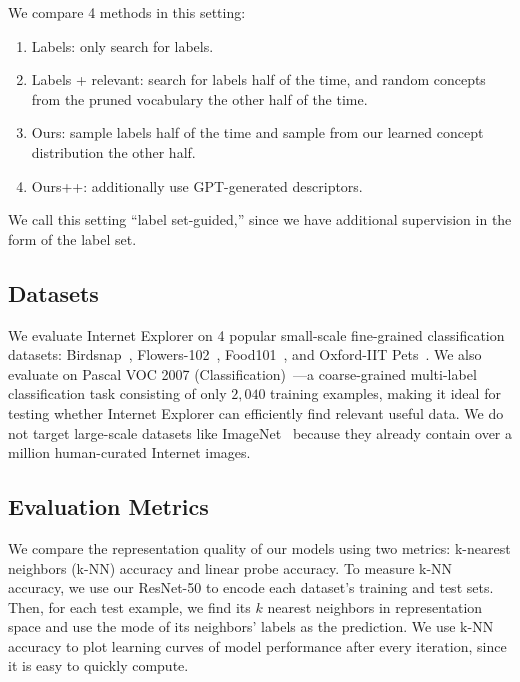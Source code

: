 We compare 4 methods in this setting:
\begin{enumerate}[noitemsep,topsep=0pt]
    \item Labels: only search for labels. 
    \item Labels + relevant: search for labels half of the time, and random concepts from the pruned vocabulary the other half of the time. 
    \item Ours: sample labels half of the time and sample from our learned concept distribution the other half. 
    \item Ours++: additionally use GPT-generated descriptors.
\end{enumerate}
We call this setting ``label set-guided,'' since we have additional supervision in the form of the label set.

\subsection{Datasets}
We evaluate Internet Explorer on 4 popular small-scale fine-grained classification datasets: Birdsnap~\cite{berg2014birdsnap}, Flowers-102~\cite{nilsback2008automated}, Food101~\cite{bossard2014food}, and Oxford-IIT Pets~\cite{parkhi2012cats}.
We also evaluate on Pascal VOC 2007 (Classification)~\cite{everingham2010pascal}---a coarse-grained multi-label classification task consisting of only $2{,}040$ training examples, making it ideal for testing whether Internet Explorer can efficiently find relevant useful data.
We do not target large-scale datasets like ImageNet~\cite{deng2009imagenet} because they already contain over a million human-curated Internet images.

\subsection{Evaluation Metrics}
We compare the representation quality of our models using two metrics: k-nearest neighbors (k-NN) accuracy  and linear probe accuracy. To measure k-NN accuracy, we use our ResNet-50 to encode each dataset's training and test sets. Then, for each test example, we find its $k$ nearest neighbors in representation space and use the mode of its neighbors' labels as the prediction. We use k-NN accuracy to plot learning curves of model performance after every iteration, since it is easy to quickly compute.

